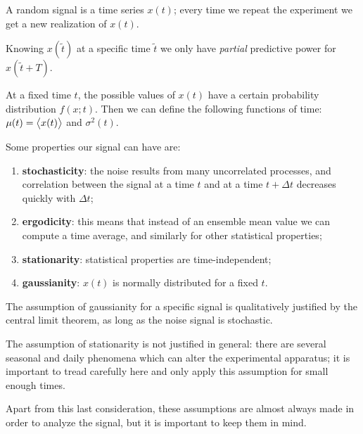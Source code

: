 \documentclass[main.tex]{subfiles}
\begin{document}
A random signal is a time series \(x(t)\); every time we repeat the experiment we get a new realization of \(x(t)\). 

Knowing \(x(\widetilde{t})\) at a specific time \(\widetilde{t}\) we only have \emph{partial} predictive power for \(x(\widetilde{t} + T)\). 

At a fixed time \(t\), the possible values of \(x(t)\) have a certain probability distribution \(f(x; t)\).
Then we can define the following functions of time: \(\mu (t) = \expval{x(t)}\) and \(\sigma^2(t)\). 


Some properties our signal can have are: 
\begin{enumerate}
    \item \textbf{stochasticity}: the noise results from many uncorrelated processes, and correlation between the signal at a time \(t\) and at a time \(t + \Delta t\) decreases quickly with \(\Delta t\);
    \item \textbf{ergodicity}: this means that instead of an ensemble mean value we can compute a time average, and similarly for other statistical properties; 
    \item \textbf{stationarity}: statistical properties are time-independent;
    \item \textbf{gaussianity}: \(x(t)\) is normally distributed for a  fixed \(t\). 
\end{enumerate}

The assumption of gaussianity for a specific signal is qualitatively justified by the central limit theorem, as long as the noise signal is stochastic. 

The assumption of stationarity is not justified in general: there are several seasonal and daily phenomena which can alter the experimental apparatus; it is important to tread carefully here and only apply this assumption for small enough times.

Apart from this last consideration, these assumptions are almost always made in order to analyze the signal, but it is important to keep them in mind.


\end{document}
